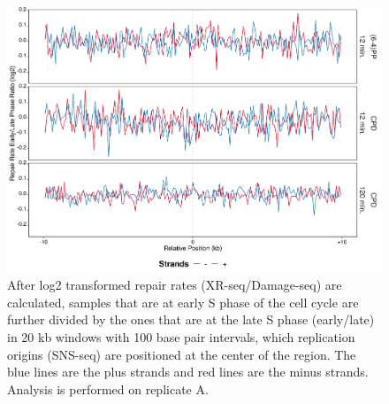 \begin{figure}[H]
\begin{center}
\includegraphics[width=\textwidth]{Chapters/7_appendix/figures/supfig56}
\caption[Repair rate early/late ratio of replication origins in 20 kb (replicate A).]{After log2 transformed repair rates (XR-seq/Damage-seq) are calculated, samples that are at early S phase of the cell cycle are further divided by the ones that are at the late S phase (early/late) in 20 kb windows with 100 base pair intervals, which replication origins (SNS-seq) are positioned at the center of the region. The blue lines are the plus strands and red lines are the minus strands. Analysis is performed on replicate A.}
\label{supfig:rrel20snsA}
\end{center}
\end{figure}


